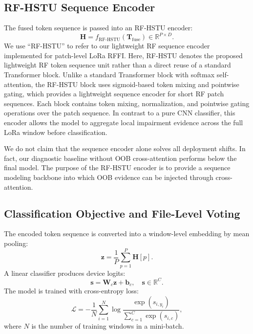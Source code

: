 \subsection{RF-HSTU Sequence Encoder}

The fused token sequence is passed into an RF-HSTU encoder:
\begin{equation}
    \mathbf{H}
    =
    f_{\mathrm{RF\text{-}HSTU}}
    \left(
    \mathbf{T}_{\mathrm{fuse}}
    \right)
    \in \mathbb{R}^{P \times D}.
\end{equation}
We use ``RF-HSTU'' to refer to our lightweight RF sequence encoder implemented for patch-level LoRa RFFI.
Here, RF-HSTU denotes the proposed lightweight RF token sequence unit rather than a direct reuse of a standard Transformer block.
Unlike a standard Transformer block with softmax self-attention, the RF-HSTU block uses sigmoid-based token mixing and pointwise gating, which provides a lightweight sequence encoder for short RF patch sequences. Each block contains token mixing, normalization, and pointwise gating operations over the patch sequence. In contrast to a pure CNN classifier, this encoder allows the model to aggregate local impairment evidence across the full LoRa window before classification.

We do not claim that the sequence encoder alone solves all deployment shifts. In fact, our diagnostic baseline without OOB cross-attention performs below the final model. The purpose of the RF-HSTU encoder is to provide a sequence modeling backbone into which OOB evidence can be injected through cross-attention.

\subsection{Classification Objective and File-Level Voting}

The encoded token sequence is converted into a window-level embedding by mean pooling:
\begin{equation}
    \mathbf{z}
    =
    \frac{1}{P}
    \sum_{p=1}^{P}
    \mathbf{H}[p].
\end{equation}
A linear classifier produces device logits:
\begin{equation}
    \mathbf{s}
    =
    \mathbf{W}_{c}\mathbf{z} + \mathbf{b}_{c},
    \quad
    \mathbf{s}\in\mathbb{R}^{C}.
\end{equation}
The model is trained with cross-entropy loss:
\begin{equation}
    \mathcal{L}
    =
    -\frac{1}{N}
    \sum_{i=1}^{N}
    \log
    \frac{\exp(s_{i,y_i})}
    {\sum_{c=1}^{C}\exp(s_{i,c})},
\end{equation}
where $N$ is the number of training windows in a mini-batch.

